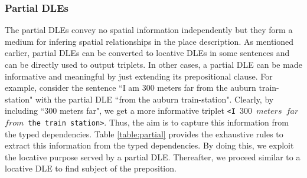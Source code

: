 \documentclass{acm_proc_article-sp}
\begin{document}
\subsubsection*{Partial DLEs}
The partial DLEs convey no spatial information independently but they form a medium for infering spatial relationships in the place description. As mentioned earlier, partial DLEs can be converted to locative DLEs in some sentences and can be directly used to output triplets. In other cases, a partial DLE can be made informative and meaningful by just extending its prepositional clause. For example, consider the sentence ``I am 300 meters far from the auburn train-station" with the partial DLE ``from the auburn train-station". Clearly, by including ``300 meters far", we get a more informative triplet \texttt{<I $300$ $meters$ $far$ $from$ the train station>}. Thus, the aim is to capture this information from the typed dependencies. Table \ref{table:partial} provides the exhaustive rules to extract this information from the typed dependencies. By doing this, we exploit the locative purpose served by a partial DLE. Thereafter, we proceed similar to a locative DLE to find subject of the preposition.



\end{document}
